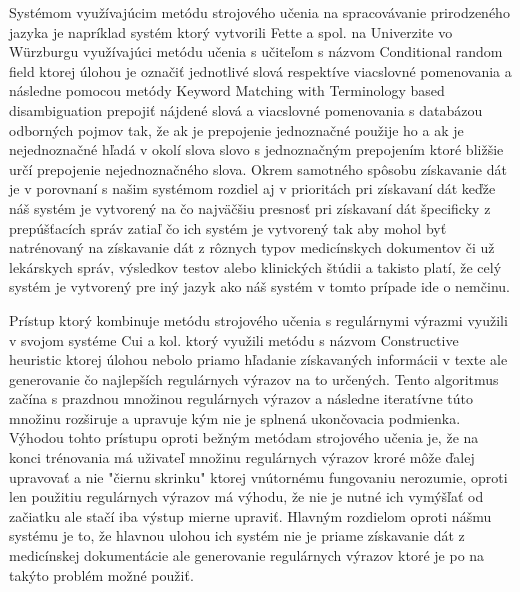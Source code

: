 Systémom využívajúcim metódu strojového učenia na
spracovávanie prirodzeného jazyka je napríklad 
systém ktorý vytvorili Fette a spol. na Univerzite
vo Würzburgu \cite{infExtGer} využívajúci metódu učenia s učiteľom 
s názvom Conditional random field \cite{CRF} ktorej úlohou
je označiť jednotlivé slová respektíve viacslovné
pomenovania a následne pomocou metódy 
Keyword Matching with Terminology based disambiguation
prepojiť nájdené slová a viacslovné pomenovania s databázou
odborných pojmov tak, že ak je prepojenie jednoznačné
použije ho a ak je nejednoznačné hľadá v okolí slova
slovo s jednoznačným prepojením ktoré bližšie určí
prepojenie nejednoznačného slova. Okrem samotného spôsobu
získavanie dát je v porovnaní s našim systémom rozdiel 
aj v prioritách pri získavaní dát keďže náš systém 
je vytvorený na čo najväčšiu presnosť pri získavaní
dát špecificky z prepúšťacích správ zatiaľ čo ich 
systém je vytvorený tak aby mohol byť natrénovaný na získavanie
dát z rôznych typov medicínskych dokumentov či už
lekárskych správ, výsledkov testov alebo klinických 
štúdii a takisto platí, že celý systém je vytvorený 
pre iný jazyk ako náš systém v tomto prípade ide o 
nemčinu. 

Prístup ktorý kombinuje metódu strojového učenia 
s regulárnymi výrazmi využili v svojom systéme
Cui a kol. \cite{CHA} ktorý využili metódu s názvom 
Constructive heuristic ktorej úlohou nebolo
priamo hľadanie získavaných informácii v texte ale
generovanie čo najlepších regulárnych výrazov
na to určených. Tento algoritmus začína s
prazdnou množinou regulárnych výrazov a 
následne iteratívne túto množinu rozširuje
a upravuje kým nie je splnená ukončovacia
podmienka. Výhodou tohto prístupu oproti
bežným metódam strojového učenia je, 
že na konci trénovania má uživateľ množinu
regulárnych výrazov kroré môže ďalej upravovať
a nie "čiernu skrinku" ktorej vnútornému fungovaniu
nerozumie, oproti len použitiu regulárnych výrazov
má výhodu, že nie je nutné ich vymýšľať
od začiatku ale stačí iba výstup mierne upraviť.
Hlavným rozdielom oproti nášmu systému je to, 
že hlavnou ulohou ich systém nie je priame získavanie
dát z medicínskej dokumentácie ale generovanie 
regulárnych výrazov ktoré je po na takýto problém
možné použiť.

